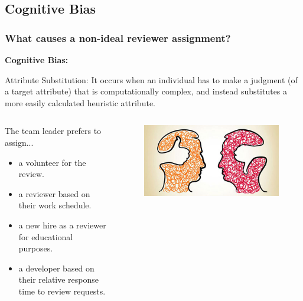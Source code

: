 \documentclass{beamer}
\begin{document}
\subsection{Cognitive Bias}
\begin{frame}
\frametitle{\large What causes a non-ideal reviewer assignment?}
    \textbf{Cognitive Bias:}
     \begin{block}{Attribute Substitution:}
        It occurs when an individual has to make a judgment (of a target attribute) that is computationally complex, and instead substitutes a more easily calculated heuristic attribute.
    \end{block}
    
    \begin{columns}
    \begin{column}{0.6\textwidth}
    The team leader prefers to assign...
      \begin{itemize}
    \item  a volunteer for the review.
    \item   a reviewer based on their work schedule.
    \item a new hire as a reviewer for educational purposes.
    \item a developer based on their relative response time to review requests.
    \end{itemize}
    \end{column}
    \begin{column}{0.4\textwidth}  %
      \begin{figure}
      \includegraphics[scale=0.2]{img/cog_bias.jpg}
      \end{figure}
\end{column}
\end{columns}


\end{frame}
\end{document}
